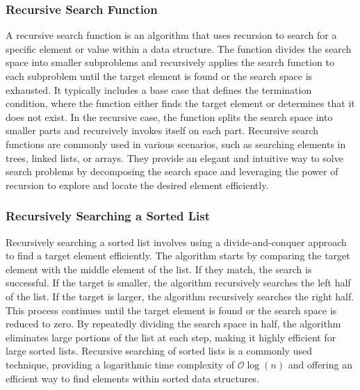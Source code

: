 \subsubsection{Recursive Search Function}

A recursive search function is an algorithm that uses recursion to search for a specific element or value within a data structure. The function divides the search space into smaller subproblems and recursively applies the search function to each subproblem until the target element is found or the 
search space is exhausted. It typically includes a base case that defines the termination condition, where the function either finds the target element or determines that it does not exist. In the recursive case, the function splits the search space into smaller parts and recursively invokes itself 
on each part. Recursive search functions are commonly used in various scenarios, such as searching elements in trees, linked lists, or arrays. They provide an elegant and intuitive way to solve search problems by decomposing the search space and leveraging the power of recursion to explore and locate 
the desired element efficiently.

\subsubsection{Recursively Searching a Sorted List}

Recursively searching a sorted list involves using a divide-and-conquer approach to find a target element efficiently. The algorithm starts by comparing the target element with the middle element of the list. If they match, the search is successful. If the target is smaller, the algorithm recursively 
searches the left half of the list. If the target is larger, the algorithm recursively searches the right half. This process continues until the target element is found or the search space is reduced to zero. By repeatedly dividing the search space in half, the algorithm eliminates large portions of 
the list at each step, making it highly efficient for large sorted lists. Recursive searching of sorted lists is a commonly used technique, providing a logarithmic time complexity of $\mathcal{O}\log{(n)}$ and offering an efficient way to find elements within sorted data structures.

